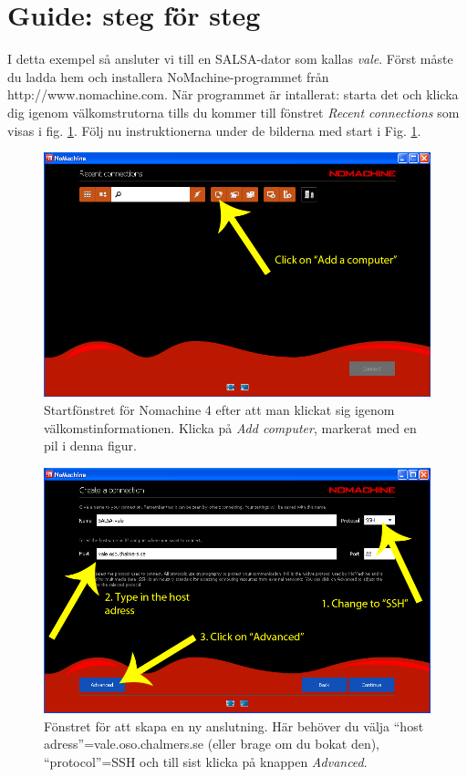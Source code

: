 \section{Guide: steg för steg}
I detta exempel så ansluter vi till en SALSA-dator som kallas \emph{vale}.
Först måste du ladda hem och installera NoMachine-programmet från
http://www.nomachine.com.  När programmet är intallerat: starta det och klicka
dig igenom välkomstrutorna tills du kommer till fönstret \emph{Recent
connections} som visas i fig. \ref{fig:recentconn}. Följ nu instruktionerna
under de bilderna med start i Fig. \ref{fig:recentconn}. 
\begin{figure}[H]
    \centering
    \includegraphics[height=0.25\paperheight]{../figures/nomachinefigs/fig1_recentconn.png}
    \caption{Startfönstret för Nomachine 4 efter att man klickat sig igenom välkomstinformationen. Klicka på \emph{Add computer}, markerat med en pil i denna figur.}
    \label{fig:recentconn}
\end{figure}
\begin{figure}[H]
    \centering
    \includegraphics[height=0.25\paperheight]{../figures/nomachinefigs/fig2_create.png}
    \caption{Fönstret för att skapa en ny anslutning. Här behöver du välja ``host adress''=vale.oso.chalmers.se (eller brage om du bokat den), ``protocol''=SSH och till sist klicka på knappen \emph{Advanced}.}
    \label{fig:create}
\end{figure}
